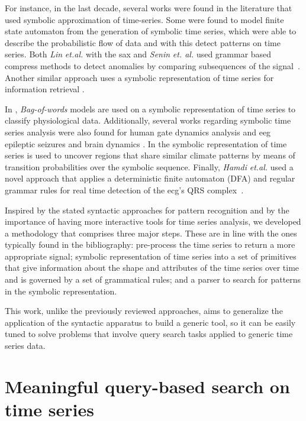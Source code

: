 \par
For instance, in the last decade, several works were found in the literature that used symbolic approximation of time-series. Some were found to model finite state automaton from the generation of symbolic time series, which were able to describe the probabilistic flow of data and with this detect patterns on time series\cite{Rajagopalan,Piccardi}. Both \textit{Lin} \textit{et.al.} with the \gls{sax} and \textit{Senin} \textit{et. al.} used grammar based compress methods to detect anomalies by comparing subsequences of the signal~\cite{sax,Senin}. Another similar approach uses a symbolic representation of time series for information retrieval \cite{YueLi2017}. 
\par
In \cite{Ordonez2011}, \textit{Bag-of-words} models are used on a symbolic representation of time series to classify physiological data. Additionally, several works regarding symbolic time series analysis were also found for human gate dynamics analysis \cite{Abbasi2014,JianYu2017} and \gls{eeg} epileptic seizures and brain dynamics \cite{Hussain2017}. In \cite{Tirabassi2016} the symbolic representation of time series is used to uncover regions that share similar climate patterns by means of transition probabilities over the symbolic sequence. Finally, \textit{Hamdi} \textit{et.al.} used a novel approach that applies a deterministic finite automaton (DFA) and regular grammar rules for real time detection of the \gls{ecg}'s QRS complex~\cite{Hamdi2017}. 
\par
Inspired by the stated syntactic approaches for pattern recognition and by the importance of having more interactive tools for time series analysis, we developed a methodology that comprises three major steps. These are in line with the ones typically found in the bibliography: pre-process the time series to return a more appropriate signal; symbolic representation of time series into a set of primitives that give information about the shape and attributes of the time series over time and is governed by a set of grammatical rules; and a parser to search for patterns in the symbolic representation.
\par
This work, unlike the previously reviewed approaches, aims to generalize the application of the syntactic apparatus to build a generic tool, so it can be easily tuned to solve problems that involve query search tasks applied to generic time series data.

\section{Meaningful query-based search on time series}

